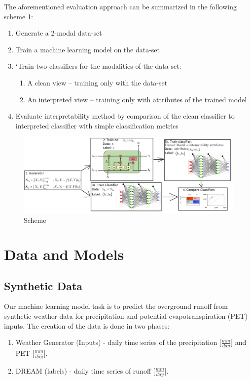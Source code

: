 \documentclass[12pt]{report}
\begin{document}
The aforementioned evaluation approach can be summarized in the following scheme \ref{scheme}:
\begin{enumerate}
	\item Generate a 2-modal data-set
	\item Train a machine learning model on the data-set
	\item`Train two classifiers for the modalities of the data-set:
	\begin{enumerate}
		\item A clean view – training only with the data-set
		\item An interpreted view – training only with attributes of the trained model 	
    \end{enumerate}
	\item Evaluate interpretability method by comparison of the clean classifier to interpreted classifier
	with simple classification metrics		
\end{enumerate}
\begin{figure}[H]
	\centering\includegraphics[width=16.4cm]{scheme.png}
	\caption{Scheme}
	\label{scheme}
\end{figure}
\chapter{Data and Models} 

\section{Synthetic Data}

Our machine learning model task is to predict the overground runoff from synthetic weather data for precipitation and potential evapotranspiration (PET) inputs. The creation of the data is done in two phases:

\begin{enumerate}
	\item Weather Generator (Inputs) - daily time series of the precipitation $\Big[\frac{mm}{day}\Big]$ and PET $\Big[\frac{mm}{day}\Big]$.
	\item DREAM (labels) - daily time series of runoff $\Big[\frac{mm}{day}\Big]$.
\end{enumerate}
 
\end{document}
